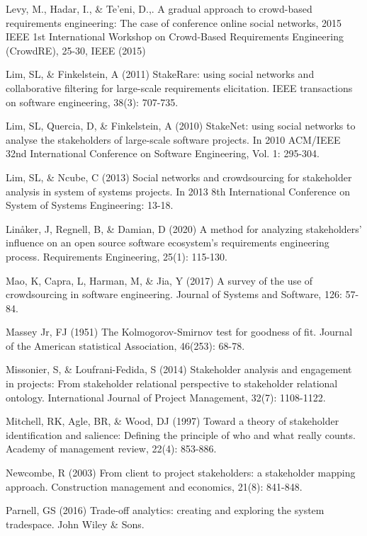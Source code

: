 \begin{thebibliography}{}
Levy, M., Hadar, I., \& Te'eni, D.,. A gradual approach to crowd-based requirements engineering: The case of conference online social networks, 2015 IEEE 1st International Workshop on Crowd-Based Requirements Engineering (CrowdRE), 25-30, IEEE (2015)

Lim, SL, \& Finkelstein, A (2011) StakeRare: using social networks and collaborative filtering for large-scale requirements elicitation. IEEE transactions on software engineering, 38(3): 707-735.

Lim, SL, Quercia, D, \& Finkelstein, A (2010) StakeNet: using social networks to analyse the stakeholders of large-scale software projects. In 2010 ACM/IEEE 32nd International Conference on Software Engineering, Vol. 1: 295-304.

Lim, SL, \& Ncube, C (2013) Social networks and crowdsourcing for stakeholder analysis in system of systems projects. In 2013 8th International Conference on System of Systems Engineering: 13-18.

Linåker, J, Regnell, B, \& Damian, D (2020) A method for analyzing stakeholders’ influence on an open source software ecosystem’s requirements engineering process. Requirements Engineering, 25(1): 115-130.

Mao, K, Capra, L, Harman, M, \& Jia, Y (2017) A survey of the use of crowdsourcing in software engineering. Journal of Systems and Software, 126: 57-84.

Massey Jr, FJ (1951) The Kolmogorov-Smirnov test for goodness of fit. Journal of the American statistical Association, 46(253): 68-78.

Missonier, S, \& Loufrani-Fedida, S (2014) Stakeholder analysis and engagement in projects: From stakeholder relational perspective to stakeholder relational ontology. International Journal of Project Management, 32(7): 1108-1122.

Mitchell, RK, Agle, BR, \& Wood, DJ (1997) Toward a theory of stakeholder identification and salience: Defining the principle of who and what really counts. Academy of management review, 22(4): 853-886.

Newcombe, R (2003) From client to project stakeholders: a stakeholder mapping approach. Construction management and economics, 21(8): 841-848.

Parnell, GS (2016) Trade-off analytics: creating and exploring the system tradespace. John Wiley & Sons.


\end{thebibliography}
